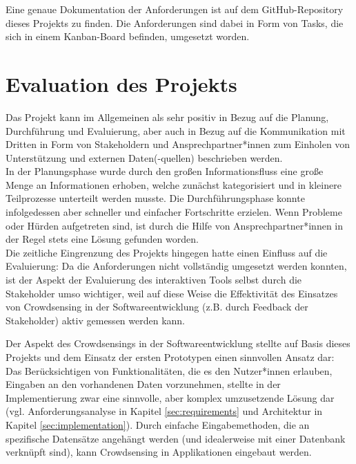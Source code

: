 Eine genaue Dokumentation der Anforderungen ist auf dem GitHub-Repository dieses Projekts zu finden. Die Anforderungen sind dabei in Form von Tasks, die sich in einem Kanban-Board befinden, umgesetzt worden.

\section{Evaluation des Projekts}
\label{sec:personal_evaluation}
Das Projekt kann im Allgemeinen als sehr positiv in Bezug auf die Planung, Durchführung und Evaluierung, aber auch in Bezug auf die Kommunikation mit Dritten in Form von Stakeholdern und Ansprechpartner*innen zum Einholen von Unterstützung und externen Daten(-quellen) beschrieben werden. \\ In der Planungsphase wurde durch den großen Informationsfluss eine große Menge an Informationen erhoben, welche zunächst kategorisiert und in kleinere Teilprozesse unterteilt werden musste. Die Durchführungsphase konnte infolgedessen aber schneller und einfacher Fortschritte erzielen. Wenn Probleme oder Hürden aufgetreten sind, ist durch die Hilfe von Ansprechpartner*innen in der Regel stets eine Lösung gefunden worden. \\ Die zeitliche Eingrenzung des Projekts hingegen hatte einen Einfluss auf die Evaluierung: Da die Anforderungen nicht vollständig umgesetzt werden konnten, ist der Aspekt der Evaluierung des interaktiven Tools selbst durch die Stakeholder umso wichtiger, weil auf diese Weise die Effektivität des Einsatzes von Crowdsensing in der Softwareentwicklung (z.B. durch Feedback der Stakeholder) aktiv gemessen werden kann.

Der Aspekt des Crowdsensings in der Softwareentwicklung stellte auf Basis dieses Projekts und dem Einsatz der ersten Prototypen einen sinnvollen Ansatz dar: Das Berücksichtigen von Funktionalitäten, die es den Nutzer*innen erlauben, Eingaben an den vorhandenen Daten vorzunehmen, stellte in der Implementierung zwar eine sinnvolle, aber komplex umzusetzende Lösung dar (vgl. Anforderungsanalyse in Kapitel \ref{sec:requirements} und Architektur in Kapitel \ref{sec:implementation}). Durch einfache Eingabemethoden, die an spezifische Datensätze angehängt werden (und idealerweise mit einer Datenbank verknüpft sind), kann Crowdsensing in Applikationen eingebaut werden.

